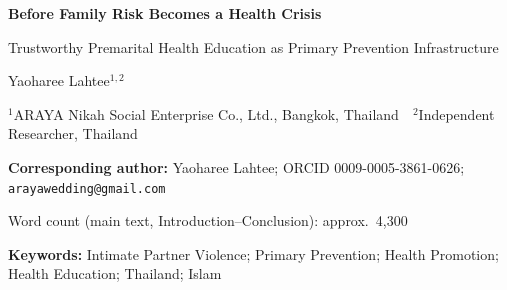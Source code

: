\documentclass[11pt]{article}
\begin{document}
\begin{center}
{\LARGE\bfseries\color{ocsi} Before Family Risk Becomes a Health Crisis}\par\vspace{1.5mm}
{\large Trustworthy Premarital Health Education as Primary Prevention Infrastructure}\par\vspace{4mm}
{\normalsize Yaoharee Lahtee$^{1,2}$}\par
{\small $^{1}$ARAYA Nikah Social Enterprise Co., Ltd., Bangkok, Thailand \,\textbullet\, $^{2}$Independent Researcher, Thailand}\par
{\small \textbf{Corresponding author:} Yaoharee Lahtee; ORCID 0009-0005-3861-0626; \texttt{arayawedding@gmail.com}}\par
{\small Word count (main text, Introduction--Conclusion): approx.\ 4{,}300}\par
{\small \textbf{Keywords:} Intimate Partner Violence; Primary Prevention; Health Promotion; Health Education; Thailand; Islam}\par
\end{center}
\vspace{3mm}
\end{document}
